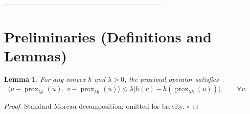\documentclass{article}
\newtheorem{lemma}{Lemma}
\begin{document}
---------------------------------------------------------------------

\section*{Preliminaries (Definitions and Lemmas)}
\begin{lemma}\label{lem:prox-ineq}
For any convex $h$ and $\lambda>0$, the proximal operator satisfies  
\[
\langle u-\operatorname{prox}_{\lambda h}(u),\;v-\operatorname{prox}_{\lambda h}(u)\rangle
\le \lambda\bigl[h(v)-h(\operatorname{prox}_{\lambda h}(u))\bigr],
\qquad\forall v.
\tag{5}
\]
\end{lemma}
\begin{proof}
Standard Moreau decomposition; omitted for brevity. \hfill $\square$
\end{proof}
\end{document}

